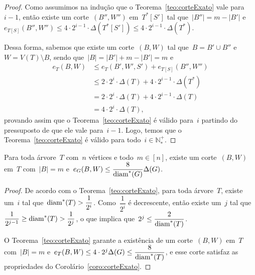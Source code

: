\begin{proof}
			Como assumimos na indução que o Teorema~\ref{teo:corteExato} vale
			para~${i-1}$, então existe um corte~$(B'',W'')$ em~$T^*[S']$
			tal que~${|B''|=m-|B'|}$ 
			e~${e_{T[S]}(B'',W'')\le 4\cdot 2^{i-1}\cdot
			\Delta(T^*[S'])\le 4\cdot 2^{i-1}\cdot\Delta(T^*)}$.

			Dessa forma, sabemos que existe um corte~$(B,W)$ tal
			que~${B=B'\cup B''}$ e~${W=V(T)\setminus B}$, sendo 
			que~${|B|=|B'| + m-|B'| = m}$ e
			\begin{align}
				e_T(B,W)&\le e_T(B',W',S') + e_{T[S]}(B'',W'') 
				\nonumber\\
				&\le 2\cdot2^i\cdot\Delta(T) + 4\cdot 2^{i-1}\cdot
				\Delta(T^*)\nonumber\\
				&= 2\cdot2^i\cdot\Delta(T) + 4\cdot 2^{i-1}\cdot
				\Delta(T)\nonumber\\
				&= 4\cdot 2^{i}\cdot\Delta(T), \nonumber
			\end{align}
			provando assim que o Teorema~\ref{teo:corteExato} é
			válido para~$i$ partindo do pressuposto de que ele vale
			para~${i-1}$. Logo, temos que o 
			Teorema~\ref{teo:corteExato} é válido para 
			todo~${i\in \mathbb{N^+_*}}$.
			
	\end{proof}

	\bigskip
	\bigskip

	\begin{coro}
	\label{coro:corteExato}
		Para toda árvore~$T$ com~$n$ vértices e todo~${m\in[n]}$, existe
		um corte~$(B,W)$ em~$T$ com~${|B|=m}$ 
		e~${e_G(B,W)\le \dfrac{8}{\mathrm{diam}^*(G)}\Delta(G)}$.
	\end{coro}

	\begin{proof}
		De acordo com o Teorema~\ref{teo:corteExato}, para toda árvore~$T$,
		existe um~$i$ tal que~${\mathrm{diam}^*(T)>\dfrac{1}{2^i}}$. 
		Como~${\dfrac{1}{2^i}}$ é decrescente, então existe um~$j$ tal
		que~${\dfrac{1}{2^{j-1}}\ge\mathrm{diam}^*(T)>\dfrac{1}{2^j}}$,
		o que implica que~${2^j\le\dfrac{2}{\mathrm{diam}^*(T)}}$.

		O Teorema~\ref{teo:corteExato} garante a existência de um 
		corte~$(B,W)$ em~$T$ com~${|B|=m}$ 
		e~$e_T(B,W)\le 4\cdot 2^j\Delta(G)\le \dfrac{8}{\mathrm{diam}^*(T)}$,
		e esse corte satisfaz as propriedades do 
		Corolário~\ref{coro:corteExato}. 
	\end{proof}

